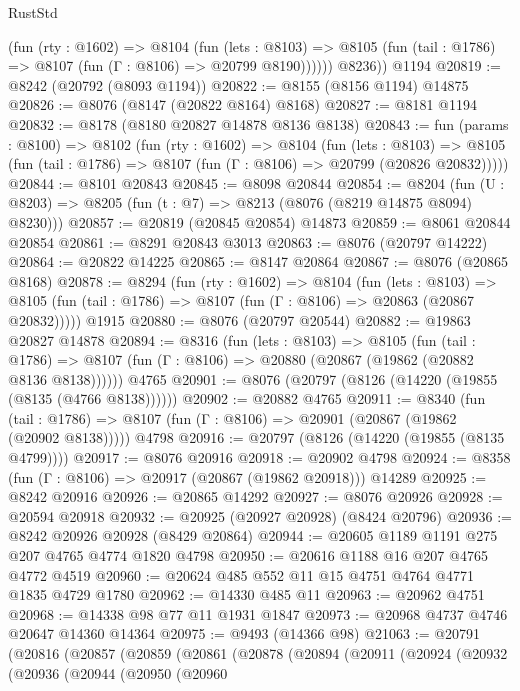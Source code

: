 \begin{lexlean}{RustStd}
\begin{coremodule}
            (fun (rty : @1602) =>
            @8104
              (fun (lets : @8103) =>
              @8105 (fun (tail : @1786) => @8107 (fun (Γ : @8106) => @20799 @8190))))))
        @8236))
    @1194
@20819 := @8242 (@20792 (@8093 @1194))
@20822 := @8155 (@8156 @1194) @14875
@20826 := @8076 (@8147 (@20822 @8164) @8168)
@20827 := @8181 @1194
@20832 := @8178 (@8180 @20827 @14878 @8136 @8138)
@20843 := fun (params : @8100) =>
  @8102
    (fun (rty : @1602) =>
    @8104
      (fun (lets : @8103) =>
      @8105 (fun (tail : @1786) => @8107 (fun (Γ : @8106) => @20799 (@20826 @20832)))))
@20844 := @8101 @20843
@20845 := @8098 @20844
@20854 := @8204
    (fun (U : @8203) => @8205 (fun (t : @7) => @8213 (@8076 (@8219 @14875 @8094) @8230)))
@20857 := @20819 (@20845 @20854) @14873
@20859 := @8061 @20844 @20854
@20861 := @8291 @20843 @3013
@20863 := @8076 (@20797 @14222)
@20864 := @20822 @14225
@20865 := @8147 @20864
@20867 := @8076 (@20865 @8168)
@20878 := @8294
    (fun (rty : @1602) =>
    @8104
      (fun (lets : @8103) =>
      @8105 (fun (tail : @1786) => @8107 (fun (Γ : @8106) => @20863 (@20867 @20832)))))
    @1915
@20880 := @8076 (@20797 @20544)
@20882 := @19863 @20827 @14878
@20894 := @8316
    (fun (lets : @8103) =>
    @8105
      (fun (tail : @1786) =>
      @8107 (fun (Γ : @8106) => @20880 (@20867 (@19862 (@20882 @8136 @8138))))))
    @4765
@20901 := @8076 (@20797 (@8126 (@14220 (@19855 (@8135 (@4766 @8138))))))
@20902 := @20882 @4765
@20911 := @8340
    (fun (tail : @1786) => @8107 (fun (Γ : @8106) => @20901 (@20867 (@19862 (@20902 @8138)))))
    @4798
@20916 := @20797 (@8126 (@14220 (@19855 (@8135 @4799))))
@20917 := @8076 @20916
@20918 := @20902 @4798
@20924 := @8358 (fun (Γ : @8106) => @20917 (@20867 (@19862 @20918))) @14289
@20925 := @8242 @20916
@20926 := @20865 @14292
@20927 := @8076 @20926
@20928 := @20594 @20918
@20932 := @20925 (@20927 @20928) (@8424 @20796)
@20936 := @8242 @20926 @20928 (@8429 @20864)
@20944 := @20605 @1189 @1191 @275 @207 @4765 @4774 @1820 @4798
@20950 := @20616 @1188 @16 @207 @4765 @4772 @4519
@20960 := @20624 @485 @552 @11 @15 @4751 @4764 @4771 @1835 @4729 @1780
@20962 := @14330 @485 @11
@20963 := @20962 @4751
@20968 := @14338 @98 @77 @11 @1931 @1847
@20973 := @20968 @4737 @4746 @20647 @14360 @14364
@20975 := @9493 (@14366 @98)
@21063 := @20791
    (@20816
      (@20857
        (@20859
          (@20861
            (@20878
              (@20894
                (@20911
                  (@20924
                    (@20932
                      (@20936
                        (@20944
                          (@20950
                            (@20960

\end{coremodule}
\end{lexlean}
